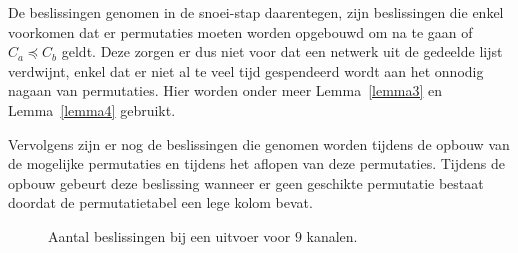\documentclass{article}
\begin{document}
De beslissingen genomen in de snoei-stap daarentegen, zijn beslissingen die enkel voorkomen dat er permutaties moeten worden opgebouwd om na te gaan of $C_a \preceq C_b$ geldt.
Deze zorgen er dus niet voor dat een netwerk uit de gedeelde lijst verdwijnt, enkel dat er niet al te veel tijd gespendeerd wordt aan het onnodig nagaan van permutaties.
Hier worden onder meer Lemma~\ref{lemma3} en Lemma~\ref{lemma4} gebruikt.

Vervolgens zijn er nog de beslissingen die genomen worden tijdens de opbouw van de mogelijke permutaties en tijdens het aflopen van deze permutaties.
Tijdens de opbouw gebeurt deze beslissing wanneer er geen geschikte permutatie bestaat doordat de permutatietabel een lege kolom bevat.

\begin{figure}[!h]
\centering
\caption{Aantal beslissingen bij een uitvoer voor $9$ kanalen.}
\label{AantalBeslissingen9Kanalen}
\end{figure}
\end{document}
